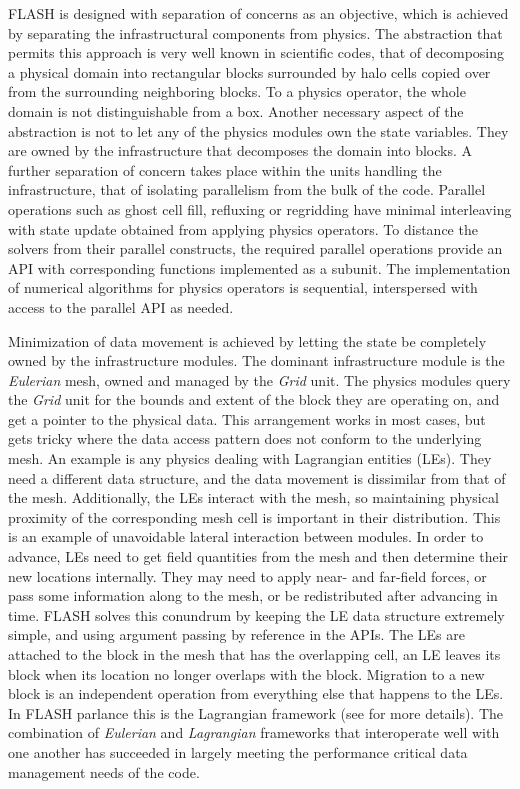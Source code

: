 FLASH is designed with separation of concerns as an objective, which
is achieved by separating the infrastructural components
from physics. The abstraction that permits this approach is very
well known in scientific codes, that of decomposing a physical domain into
rectangular blocks surrounded by halo cells copied over from the
surrounding neighboring blocks. To a physics operator, the whole domain is
not distinguishable from a box. Another necessary aspect of the abstraction 
is not to let any of the physics modules own the state
variables. They are owned by the infrastructure that 
decomposes the domain into blocks. A further separation of concern
takes place within the units handling the infrastructure, that of
isolating parallelism from the bulk of the code. Parallel
operations such as ghost cell fill, refluxing or regridding have
minimal interleaving with state update obtained from applying
physics operators. To distance the solvers from their parallel
constructs, the required parallel operations provide an API with
corresponding functions implemented as a subunit. The implementation
of numerical algorithms for physics operators is sequential,
interspersed with access to the parallel API as needed. 

Minimization of data movement is achieved by letting the state be
completely owned by the infrastructure modules. The dominant
infrastructure module is the {\em Eulerian} mesh, owned and managed by
the {\em Grid} unit. The physics modules query the {\em Grid} unit
for the bounds and extent of the block they are operating on, and
get a pointer to the physical data. This arrangement works in most
cases, but gets tricky where  the data access pattern does not conform
to the underlying mesh. An example is any physics dealing with
Lagrangian entities (LEs). They need a different data structure, and
the data movement is dissimilar from that of the mesh. Additionally,
the LEs interact with the mesh, so maintaining physical proximity of
the corresponding mesh cell is important in their distribution. This
is an example of unavoidable lateral interaction between modules. In order
to advance, LEs need to get field quantities from the mesh and
then determine their new locations internally. They may
need to apply near- and far-field forces, or pass some information
along to the mesh, or be redistributed after advancing in time. FLASH solves 
this conundrum by keeping the LE data structure extremely simple,
and using argument passing by reference in the APIs. The LEs are
attached to the block in the mesh that has the overlapping cell, an LE
leaves its block when its location no longer overlaps with the
block. Migration to a new block is an independent operation from
everything else that happens to the LEs. In FLASH parlance this is
the Lagrangian framework (see \cite{Dubey2012} for more details). The
combination of {\em Eulerian} and {\em Lagrangian} frameworks that
interoperate well with one another has succeeded in largely meeting the
performance critical data management needs of the code. 

